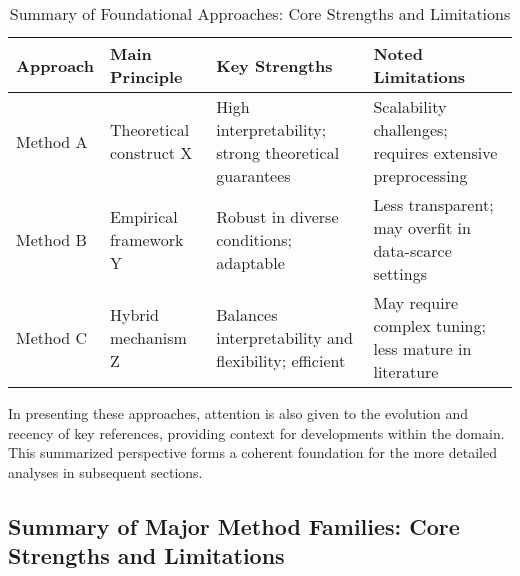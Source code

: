 \documentclass[sigconf]{acmart}
\begin{document}
\begin{table*}[htbp]
\centering
\caption{Summary of Foundational Approaches: Core Strengths and Limitations}
\label{tab:foundational-overview}
\begin{adjustbox}{max width=\textwidth}
\begin{tabular}{@{}llll@{}}
\toprule
Approach & Main Principle & Key Strengths & Noted Limitations \\
\midrule
Method A & Theoretical construct X & High interpretability; strong theoretical guarantees & Scalability challenges; requires extensive preprocessing \\
Method B & Empirical framework Y & Robust in diverse conditions; adaptable & Less transparent; may overfit in data-scarce settings \\
Method C & Hybrid mechanism Z & Balances interpretability and flexibility; efficient & May require complex tuning; less mature in literature \\
\bottomrule
\end{tabular}
\end{adjustbox}
\end{table*}

In presenting these approaches, attention is also given to the evolution and recency of key references, providing context for developments within the domain. This summarized perspective forms a coherent foundation for the more detailed analyses in subsequent sections.

\subsection*{Summary of Major Method Families: Core Strengths and Limitations}
\end{document}
